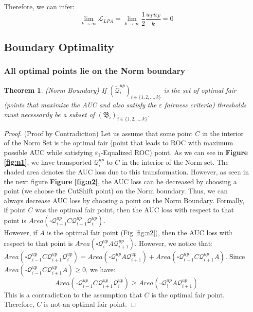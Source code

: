 \documentclass{article}
\newtheorem{theorem}{Theorem}[section]
\newcommand{\ourdef}{-Equalized ROC}
\begin{document}
Therefore, we can infer:
\[ \lim_{k\to\infty} \mathcal{L}_{LPA} =\lim_{k\to\infty} \frac{1}{2} \frac{u_Tu_F}{k} =0 \]
\subsection{Boundary Optimality}
\subsubsection{All optimal points lie on the Norm boundary}


\begin{theorem}(Norm Boundary)
    If $(\widetilde{\mathcal{Q}}_i^{up})_{i\in \{1 ,2 , \hdots , k\}}$ is the set of optimal fair (points that maximize the AUC and also satisfy the $\varepsilon$ fairness criteria) thresholds must necessarily be a subset of $(\mathfrak{B}_i)_{i\in \{1 ,2 , \hdots , k\}}$. 
\end{theorem}

\begin{proof}
(Proof by Contradiction) 
Let us assume that some point $C$ in the interior of the Norm Set is the optimal fair (point that leads to ROC with maximum possible AUC while satisfying $\varepsilon_1$\ourdef) point. 
As we can see in \textbf{Figure \ref{fig:n1}}, we have transported $\mathcal{Q}_{i}^{up}$ to $C$ in the interior of the Norm set. The shaded area denotes the AUC loss due to this transformation. However, as seen in the next figure \textbf{Figure \ref{fig:n2}}, the AUC loss can be decreased by choosing a point (we choose the CutShift point) on the Norm boundary. Thus, we can always decrease AUC loss by choosing a point on the Norm Boundary. Formally, if point $C$ was the optimal fair point, then the AUC loss with respect to that point is $Area(\square \mathcal{Q}^{up}_{i-1} C \mathcal{Q}^{up}_{i+1} \mathcal{Q}^{up}_{i})$. 
\\
However, if $A$ is the optimal fair point (Fig \ref{fig:n2}), then the AUC loss with respect to that point is $Area(\square \mathcal{Q}^{up}_{i} A \mathcal{Q}^{up}_{i+1})$. However, we notice that:$Area(\square \mathcal{Q}^{up}_{i-1} C \mathcal{Q}^{up}_{i+1} \mathcal{Q}^{up}_{i}) = Area(\square \mathcal{Q}^{up}_{i} A \mathcal{Q}^{up}_{i+1}) + Area(\square \mathcal{Q}^{up}_{i-1} C \mathcal{Q}^{up}_{i+1} A)$. Since $Area(\square \mathcal{Q}^{up}_{i-1} C \mathcal{Q}^{up}_{i+1} A) \ge 0$, we have:
    \[Area(\square \mathcal{Q}^{up}_{i-1} C \mathcal{Q}^{up}_{i+1} \mathcal{Q}^{up}_{i}) \ge Area(\square \mathcal{Q}^{up}_{i} A \mathcal{Q}^{up}_{i+1}) \]
This is a contradiction to the assumption that $C$ is the optimal fair point. Therefore, $C$ is not an optimal fair point.
\end{proof}
\end{document}
